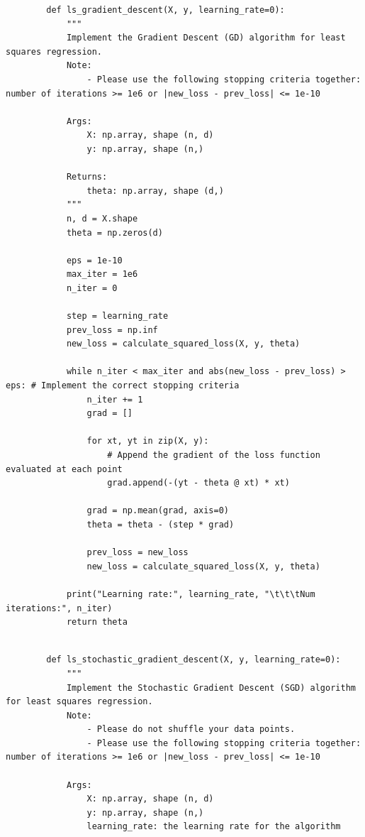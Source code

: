 \documentclass[12pt, letterpaper]{article}
\renewcommand{\t}[1]{\text{#1}}
\begin{document}
\begin{solution}{}
    \begin{verbatim}
        def ls_gradient_descent(X, y, learning_rate=0):
            """
            Implement the Gradient Descent (GD) algorithm for least squares regression.
            Note:
                - Please use the following stopping criteria together: number of iterations >= 1e6 or |new_loss - prev_loss| <= 1e-10

            Args:
                X: np.array, shape (n, d) 
                y: np.array, shape (n,)
            
            Returns:
                theta: np.array, shape (d,)
            """
            n, d = X.shape
            theta = np.zeros(d)

            eps = 1e-10
            max_iter = 1e6
            n_iter = 0

            step = learning_rate
            prev_loss = np.inf
            new_loss = calculate_squared_loss(X, y, theta)

            while n_iter < max_iter and abs(new_loss - prev_loss) > eps: # Implement the correct stopping criteria
                n_iter += 1
                grad = []

                for xt, yt in zip(X, y):
                    # Append the gradient of the loss function evaluated at each point
                    grad.append(-(yt - theta @ xt) * xt)

                grad = np.mean(grad, axis=0)
                theta = theta - (step * grad)

                prev_loss = new_loss
                new_loss = calculate_squared_loss(X, y, theta)

            print("Learning rate:", learning_rate, "\t\t\tNum iterations:", n_iter)
            return theta
    \end{verbatim}
    \begin{verbatim}

        def ls_stochastic_gradient_descent(X, y, learning_rate=0):
            """
            Implement the Stochastic Gradient Descent (SGD) algorithm for least squares regression.
            Note:
                - Please do not shuffle your data points.
                - Please use the following stopping criteria together: number of iterations >= 1e6 or |new_loss - prev_loss| <= 1e-10
            
            Args:
                X: np.array, shape (n, d) 
                y: np.array, shape (n,)
                learning_rate: the learning rate for the algorithm
            

\end{verbatim}
\end{solution}
\end{document}
